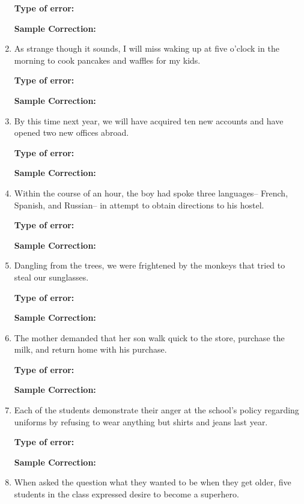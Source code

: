 \documentclass[12pt]{book}
\begin{document}
\begin{enumerate}
\bigskip
\textbf{Type of error:} \hrulefill

\textbf{Sample Correction:} \hrulefill

\item As strange though it sounds, I will miss waking up at five o'clock in the morning to cook pancakes and waffles for my kids.
 
\bigskip
\textbf{Type of error:} \hrulefill

\textbf{Sample Correction:} \hrulefill

\item By this time next year, we will have acquired ten new accounts and have opened two new offices abroad.

\bigskip
\textbf{Type of error:} \hrulefill

\textbf{Sample Correction:} \hrulefill

\item Within the course of an hour, the boy had spoke three languages-- French, Spanish, and Russian-- in attempt to obtain directions to his hostel. 

\bigskip
\textbf{Type of error:} \hrulefill

\textbf{Sample Correction:} \hrulefill

\item Dangling from the trees, we were frightened by the monkeys that tried to steal our sunglasses. 

\bigskip
\textbf{Type of error:} \hrulefill

\textbf{Sample Correction:} \hrulefill

\item The mother demanded that her son walk quick to the store, purchase the milk, and return home with his purchase. 

\bigskip
\textbf{Type of error:} \hrulefill

\textbf{Sample Correction:} \hrulefill

\item Each of the students demonstrate their anger at the school’s policy regarding uniforms by refusing to wear anything but shirts and jeans last year. 

\bigskip
\textbf{Type of error:} \hrulefill

\textbf{Sample Correction:} \hrulefill

\item When asked the question what they wanted to be when they get older, five students in the class expressed desire to become a superhero.


\end{enumerate}
\end{document}

